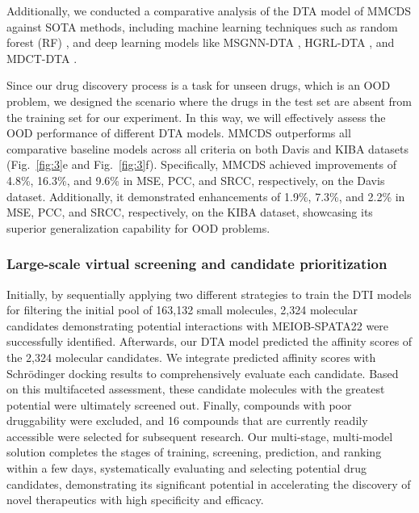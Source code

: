 \documentclass[preprint,12pt]{elsarticle}
\theoremstyle{plain}
\theoremstyle{definition}
\theoremstyle{remark}
\begin{document}
Additionally, we conducted a comparative analysis of the DTA model of MMCDS against SOTA methods, including machine learning techniques such as random forest (RF) \cite{48,49}, and deep learning models like MSGNN-DTA \cite{50}, HGRL-DTA \cite{51}, and MDCT-DTA \cite{27}.

Since our drug discovery process is a task for unseen drugs, which is an OOD problem, we designed the scenario where the drugs in the test set are absent from the training set for our experiment. In this way, we will effectively assess the OOD performance of different DTA models. MMCDS outperforms all comparative baseline models across all criteria on both Davis and KIBA datasets (Fig.~\ref{fig:3}e and Fig.~\ref{fig:3}f). Specifically, MMCDS achieved improvements of 4.8\%, 16.3\%, and 9.6\% in MSE, PCC, and SRCC, respectively, on the Davis dataset. Additionally, it demonstrated enhancements of 1.9\%, 7.3\%, and 2.2\% in MSE, PCC, and SRCC, respectively, on the KIBA dataset, showcasing its superior generalization capability for OOD problems.


\subsubsection*{Large-scale virtual screening and candidate prioritization}

Initially, by sequentially applying two different strategies to train the DTI models for filtering the initial pool of 163,132 small molecules, 2,324 molecular candidates demonstrating potential interactions with MEIOB-SPATA22 were successfully identified. Afterwards, our DTA model predicted the affinity scores of the 2,324 molecular candidates. We integrate predicted affinity scores with Schrödinger docking results to comprehensively evaluate each candidate. Based on this multifaceted assessment, these candidate molecules with the greatest potential were ultimately screened out. Finally, compounds with poor druggability were excluded, and 16 compounds that are currently readily accessible were selected for subsequent research. Our multi-stage, multi-model solution completes the stages of training, screening, prediction, and ranking within a few days, systematically evaluating and selecting potential drug candidates, demonstrating its significant potential in accelerating the discovery of novel therapeutics with high specificity and efficacy.
\end{document}

